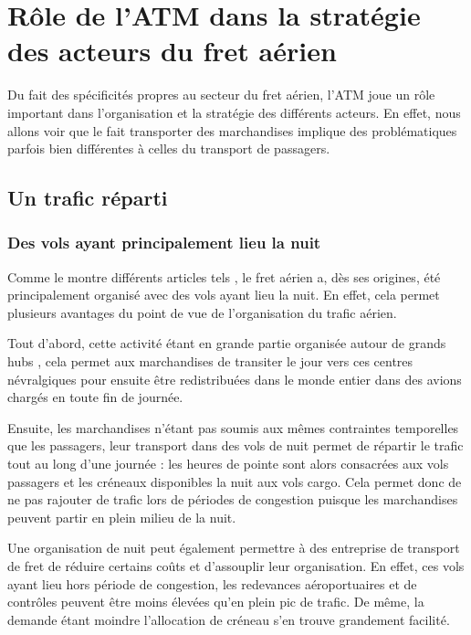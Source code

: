 \section{Rôle de l'ATM dans la stratégie des acteurs du fret aérien}


Du fait des spécificités propres au secteur du fret aérien, l'ATM joue un rôle important dans l'organisation et la stratégie des différents acteurs. En effet, nous allons voir que le fait transporter des marchandises implique des problématiques parfois bien différentes à celles du transport de passagers.

\subsection{Un trafic réparti}

\subsubsection{Des vols ayant principalement lieu la nuit}

Comme le montre différents articles tels \cite{popescu}, le fret aérien a, dès ses origines, été principalement organisé avec des vols ayant lieu la nuit. En effet, cela permet plusieurs avantages du point de vue de l'organisation du trafic aérien. 

Tout d'abord, cette activité étant en grande partie organisée autour de grands hubs \cite{Walcott201764}, cela permet aux marchandises de transiter le jour vers ces centres névralgiques pour ensuite être redistribuées dans le monde entier dans des avions chargés en toute fin de journée. 

Ensuite, les marchandises n'étant pas soumis aux mêmes contraintes temporelles que les passagers, leur transport dans des vols de nuit permet de répartir le trafic tout au long d'une journée : les heures de pointe sont alors consacrées aux vols passagers et les créneaux disponibles la nuit aux vols cargo. Cela permet donc de ne pas rajouter de trafic lors de périodes de congestion puisque les marchandises peuvent partir en plein milieu de la nuit.

Une organisation de nuit peut également permettre à des entreprise de transport de fret de réduire certains coûts et d'assouplir leur organisation. En effet, ces vols ayant lieu hors période de congestion, les redevances aéroportuaires et de contrôles peuvent être moins élevées qu'en plein pic de trafic. De même, la demande étant moindre l'allocation de créneau s'en trouve grandement facilité.

